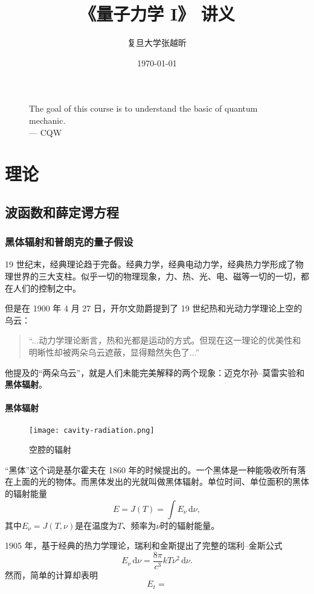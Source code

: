 \documentclass[UTF-8,heading=true,%
	zihao=-4,a4paper]{ctexbook}
\title{《量子力学 I》 讲义}
\author{\kaishu 复旦大学\quad 张越昕}
\date{\kaishu \today}
\newcommand\mr{\mathrm}
\begin{document}
\frontmatter
\maketitle
\begin{figure}
\centering
\huge The goal of this course is to understand the basic of quantum mechanic.\\
\raggedleft
\Large --- CQW
\end{figure}
\clearpage 
{}
\tableofcontents

\mainmatter
\part{理\qquad 论}
\chapter{波函数和薛定谔方程}
\section{黑体辐射和普朗克的量子假设}
19 世纪末，经典理论趋于完备。经典力学，经典电动力学，经典热力学形成了物理世界的三大支柱。似乎一切的物理现象，力、热、光、电、磁等一切的一切，都在人们的控制之中。

但是在 1900 年 4 月 27 日，开尔文勋爵提到了 19 世纪热和光动力学理论上空的乌云：
\begin{quote}\kaishu
	“...动力学理论断言，热和光都是运动的方式。但现在这一理论的优美性和明晰性却被两朵乌云遮蔽，显得黯然失色了...”
\end{quote}
他提及的“两朵乌云”，就是人们未能完美解释的两个现象：迈克尔孙--莫雷实验和\textbf{黑体辐射}。

\subsection{黑体辐射}
\begin{figure}[H]
\centering
\texttt{[image: cavity-radiation.png]}
\caption{空腔的辐射}
\end{figure}
“黑体”这个词是基尔霍夫在 1860 年的时候提出的。一个黑体是一种能吸收所有落在上面的光的物体。而黑体发出的光就叫做黑体辐射。单位时间、单位面积的黑体的辐射能量
\begin{equation}
	E=J(T)=\int E_\nu\, \mr{d}\nu,
\end{equation}
其中$E_\nu=J(T,\nu)$是在温度为$T$、频率为$\nu$时的辐射能量。

1905 年，基于经典的热力学理论，瑞利和金斯提出了完整的瑞利--金斯公式
\begin{equation}
	E_\nu\,\mr{d}\nu =\frac{8\pi}{c^3}kT\nu^2\,\mr{d}\nu.
\end{equation}
然而，简单的计算却表明
\begin{equation}
	E_t=
\end{equation}
\end{document}
